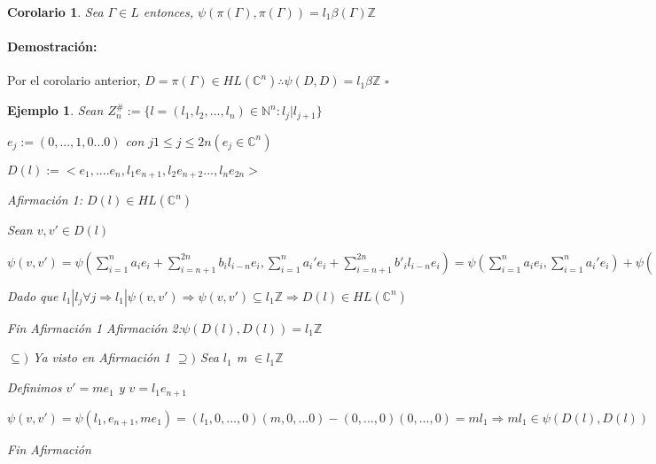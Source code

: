 \documentclass[12pt]{article}
\newtheorem{corollary}{Corolario}
\newtheorem{example}{Ejemplo}
\newenvironment{proof}{\paragraph{Demostración:}}{\hfill$\square$}
\begin{document}
 \begin{corollary}
  Sea $\Gamma  \in L$ entonces, $\psi(\pi(\Gamma),\pi(\Gamma))=l_1 \beta(\Gamma) \mathbb{Z}$  
 \end{corollary}
 \begin{proof}
  Por el corolario anterior, $D=\pi(\Gamma) \in HL(\mathbb{C}^n) \therefore \psi(D,D)=l_1 \beta \mathbb{Z}$  
 \end{proof}


\begin{example} 
 Sean 
 $Z_n^{\#}:= \{ l=(l_1,l_2,...,l_n) \in \mathbb{N}^n:l_j|l_{j+1} \}$
 
 $e_j:=(0,...,1,0...0)$ con $j 1\leq j \leq 2n (e_j \in \mathbb{C}^n)$
 
 $D(l):=<e_1,....e_n,l_1 e_{n+1},l_2 e_{n+2}...,l_n e_{2n}>$
 
 Afirmación 1: $D(l) \in HL(\mathbb{C}^n)$
 
 Sean $v,v' \in D(l)$
  
  $\psi(v,v')= \psi(\sum_{i=1}^n a_i e_i + \sum_{i=n+1}^{2n}b_i l_{i-n} e_i, \sum_{i=1}^n a_i' e_i + \sum_{i=n+1}^{2n}b'_i l_{i-n}e_i )=
  \psi(\sum_{i=1}^n a_i e_i , \sum_{i=1}^n a_i' e_i ) + \psi(\sum_{i=1}^n a_i e_i , \sum_{i=n+1}^{2n}b'_i l_{i-n} e_i) +
  \psi( \sum_{i=n+1}^{2n}b_i l_{i-n}e_i, \sum_{i=1}^n a_i' e_i ) + \psi(\sum_{i=n+1}^{2n}b_i l_{i-n}e_i, \sum_{i=n+1}^{2n}b'_i l_{i-n}e_i)=
   \sum_{i=1}^n \psi( a_i e_i , \sum_{i=n+1}^{2n}b'_i l_{i-n}e_i) + \sum_{i=n+1}^{2n}\psi( b_i l_{i-n}e_i, \sum_{i=1}^n a_i' e_i )=
   \sum_{i=1}^n \psi( a_i e_i , b'_{n+i} l_{i} e_{n+i}) + \sum_{i=n+1}^{2n}\psi( b_i l_{i-n}, a_{i-n}' e_{i-n} )=
   -\sum_{i=1}^n a_i b_{n+i}' l_i + \sum_{i=n+1}^{2n} b_i l_{i-n}a_{i-n}'=
   -\sum_{i=1}^n a_i b_{n+i}' l_i + \sum_{j=1}^{n} b_{j+n} l_{j}a_{j}'= \sum_{i=1}^{n} l_i(-a_i b_{n+i}' + a_i' b_{i+n})$
   
   Dado que $l_1|l_j \forall j \Rightarrow l_1| \psi(v,v') \Rightarrow \psi(v,v') \subseteq l_1 \mathbb{Z} \Rightarrow 
   D(l) \in HL(\mathbb{C}^n)$
   
 Fin Afirmación 1
 Afirmación 2:$\psi(D(l),D(l))=l_1 \mathbb{Z}$
 
 $\subseteq )$ Ya visto en Afirmación 1
 $\supseteq )$ Sea $l_1$ m $\in l_1 \mathbb{Z}$
 
 Definimos $v'=m e_1$ y  $v=l_1 e_{n+1}$
 
 $\psi(v,v') = \psi(l_1,e_{n+1},m e_1)= (l_1,0,...,0) (m,0,...0) - (0,...,0) (0,...,0)=m l_1 \Rightarrow m l_1 \in \psi(D(l),D(l))$
 
 Fin Afirmación  
  
\end{example}
\end{document}
